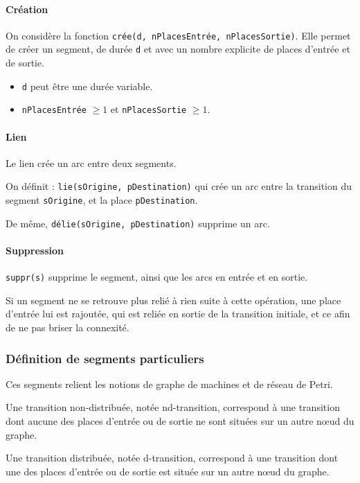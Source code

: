 \paragraph{Création}
On considère la fonction \texttt{crée(d, nPlacesEntrée, nPlacesSortie)}. Elle permet de créer un segment, de durée \texttt{d} et avec un nombre explicite de places d'entrée et de sortie.

\begin{itemize}
\item \texttt{d} peut être une durée variable.
\item \texttt{nPlacesEntrée} $ \geq 1 $ et \texttt{nPlacesSortie} $ \geq 1 $.
\end{itemize}
\paragraph{Lien}
Le lien crée un arc entre deux segments.

On définit : \texttt{lie(sOrigine, pDestination)} qui crée un arc entre la transition du segment \texttt{sOrigine}, et la place \texttt{pDestination}.

De même, \texttt{délie(sOrigine, pDestination)} supprime un arc.

\paragraph{Suppression}
\texttt{suppr(s)} supprime le segment, ainsi que les arcs en entrée et en sortie.

Si un segment ne se retrouve plus relié à rien suite à cette opération, une place d'entrée lui est rajoutée, qui est reliée en sortie de la transition initiale, et ce afin de ne pas briser la connexité.

\subsubsection{Définition de segments particuliers} 
Ces segments relient les notions de graphe de machines et de réseau de Petri.
\begin{mydef}[nd-transition]
Une transition non-distribuée, notée nd-transition, correspond à une transition dont aucune des places d'entrée ou de sortie ne sont situées sur un autre nœud du graphe.
\end{mydef}

\begin{mydef}[d-transition]
Une transition distribuée, notée d-transition, correspond à une transition dont une des places d'entrée ou de sortie est située sur un autre nœud du graphe.
\end{mydef}

